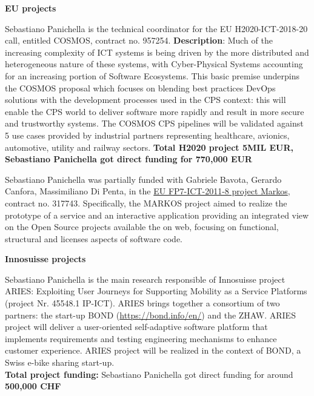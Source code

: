 \documentclass[12pt]{article}
\newcommand{\ins}[1]{\textcolor{blue}{\uline{#1}}} %
\newcommand{\ins}[1]{#1} %
\newcommand\on[1]{\nbc{ON}{#1}{red}} %
\begin{document}
\textbf{EU projects}
\begin{innerlist}
\item Sebastiano Panichella is the technical coordinator for the EU H2020-ICT-2018-20 call, entitled COSMOS, contract no. 957254. \textbf{Description}: Much of the increasing complexity of ICT systems is being driven by the more distributed and heterogeneous nature of these systems, with Cyber-Physical Systems accounting for an increasing portion of Software Ecosystems. This basic premise underpins the COSMOS proposal which focuses on blending best practices DevOps solutions with the development processes used in the CPS context: this will enable the CPS world to deliver software more rapidly and result in more secure and trustworthy systems. 
The COSMOS CPS pipelines will be validated against 5 use cases provided by industrial partners representing healthcare, avionics, automotive, utility and railway sectors.  
\textbf{Total H2020 project 5MIL EUR, Sebastiano Panichella got direct funding for 770,000 EUR} 
   \item Sebastiano Panichella was 
    partially funded with Gabriele Bavota, Gerardo Canfora, Massimiliano Di Penta, in the \href{��http://www.markosproject.eu/��}
                   {EU FP7-ICT-2011-8 project Markos}, contract no. 317743. Specifically, the MARKOS project aimed to realize the prototype of a service and an interactive application providing an integrated view on the Open Source projects available the on web, focusing on functional, structural and licenses aspects of software code. 
\end{innerlist}
\newpage
\textbf{Innosuisse projects}
\begin{innerlist}
   \item Sebastiano Panichella is the main research responsible of Innosuisse project ARIES: Exploiting User Journeys for Supporting Mobility as a Service Platforms (project Nr. 45548.1 IP-ICT).
ARIES brings together a consortium of two partners: the start-up BOND (\href{https://bond.info/en/}{https://bond.info/en/}) and the ZHAW.
ARIES project will deliver a user-oriented self-adaptive software platform that implements requirements and testing engineering mechanisms to enhance customer experience. ARIES project will be realized in the context of BOND, a Swiss e-bike sharing start-up.\\
\textbf{Total project funding:} Sebastiano Panichella got direct funding for around \textbf{500,000 CHF}\\
\end{innerlist}
\end{document}
